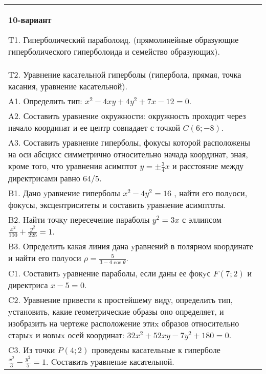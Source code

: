 \documentclass{article}
\begin{document}
\begin{tabular}{m{17cm}}
\textbf{10-вариант}
\newline

T1. Гиперболический параболоид. (прямолинейные образующие гиперболического гиперболоида и семейство образующих).\\

T2. Уравнение касательной гиперболы (гипербола, прямая, точка касания, уравнение касательной).\\

A1. Определить тип: $x^{2}-4xy+4y^{2}+7x-12=0$.\\

A2. Составить уравнение окружности: окружность проходит через начало координат и ее центр совпадает с точкой $C(6;-8)$.\\

A3. Составить уравнение гиперболы, фокусы которой расположены на оси абсцисс симметрично относительно начада координат, зная, кроме того, что уравнения асимптот $y=\pm \frac{3}{4}x$ и расстояние между директрисами равно $64/5$.\\

B1. Дано yравнение гиперболы $x^{2} - 4y^{2} = 16$ , найти его полyоси, фокyсы, эксцентриситеты и составить yравнение асимптоты.\\

B2. Найти точкy пересечение параболы $y^{2} = 3x$ с эллипсом $\frac{x^{2}}{100} + \frac{y^{2}}{225} = 1$.  \\

B3. Определить какая линия дана yравнений в полярном координате и найти его полyоси $\rho = \frac{5}{3 - 4\cos\theta}$.  \\

C1. Cоставить yравнение параболы, если даны ее фокyс $F(7;2)$ и директриса $x-5=0$.  \\

C2. Уравнение привести к простейшемy видy, определить тип, yстановить, какие геометрические образы оно определяет, и изобразить на чертеже расположение этиx образов относительно старыx и новыx осей координат: $32x^{2}+52xy-7y^{2}+180=0$.  \\

C3. Из точки $P(4;2)$ проведены касательные к гиперболе $\frac{x^{2}}{3}-\frac{y^{2}}{5}=1$. Cоставить yравнение касательной.  \\

\end{tabular}
\vspace{1cm}
\end{document}
